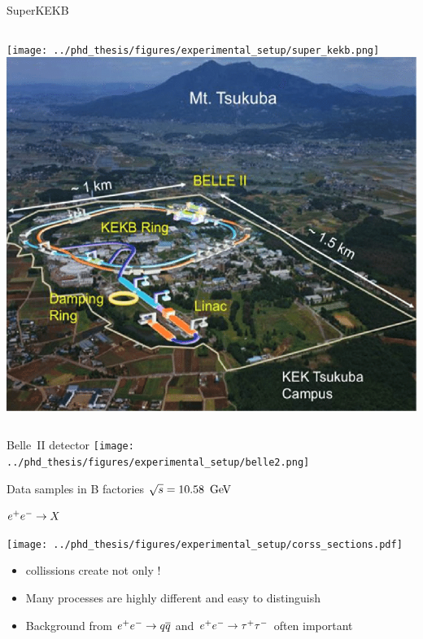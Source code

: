 \documentclass[xcolor=dvipsnames]{beamer}
\begin{document}
   \begin{frame}{SuperKEKB}
      \begin{columns}
         \texttt{[image: ../phd\_thesis/figures/experimental\_setup/super\_kekb.png]}
         \includegraphics[width=1\textwidth]{figures/Layout-of-SuperKEKB-at-the-KEK-Tsukuba-campus.png}
      \end{columns}
   \end{frame}

   \begin{frame}{Belle~II detector}
      \texttt{[image: ../phd\_thesis/figures/experimental\_setup/belle2.png]}
   \end{frame}


   \begin{frame}{Data samples in B factories}
      \scriptsize\centering
      \textbf{$\sqrt{s} = 10.58~\mathrm{\,Ge\kern -0.1em V}$}
      
      $e^+e^-\rightarrow X$

      \texttt{[image: ../phd\_thesis/figures/experimental\_setup/corss\_sections.pdf]}
      \begin{itemize}
         \item \epem collissions create not only \FourS!
         \item Many processes are highly different and easy to distinguish
         \item Background from $e^+e^-\rightarrow q\overline q$ and $e^+e^-\rightarrow\tau^+\tau^-$ often important
      \end{itemize}
   \end{frame}
\end{document}
